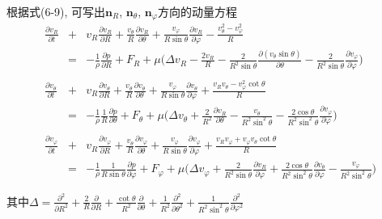 \begin{solution}
\noindent 根据式(6-9), 可写出$\mathbf{n}_R$, $\mathbf{n}_\theta$, $\mathbf{n}_\varphi$方向的动量方程
\begin{eqnarray}
\frac{\partial v_R}{\partial t} &+&
v_R\frac{\partial v_R}{\partial R}+
\frac{v_\theta}{R}\frac{\partial v_R}{\partial\theta}
+\frac{v_\varphi}{R\sin\theta}\frac{\partial v_R}{\partial\varphi}-
\frac{v_\theta^2-v_\varphi^2}{R}\nonumber\\
 & = &  -\frac{1}{\rho}\frac{\partial p}{\partial R} + F_R +
      \mu\Big(
          \Delta v_R -
          \frac{2v_R}{R} -
          \frac{2}{R^2\sin\theta}\frac{\partial(v_\theta\sin\theta)}{\partial\theta} - \frac{2}{R^2\sin\theta}\frac{\partial v_\varphi}{\partial\varphi}
      \Big)
\nonumber\\
\nonumber\\
\frac{\partial v_\theta}{\partial t} &+&
v_R\frac{\partial v_\theta}{\partial R}+
\frac{v_\theta}{R}\frac{\partial v_\theta}{\partial\theta}
+\frac{v_\varphi}{R\sin\theta}\frac{\partial v_\theta}{\partial\varphi}+
\frac{v_Rv_\theta-v_\varphi^2\cot\theta}{R}\nonumber\\
 & = & -\frac{1}{\rho}\frac{1}{R}\frac{\partial p}{\partial\theta} + F_\theta+\mu\Big(
          \Delta v_\theta +
          \frac{2}{R^2}\frac{\partial v_R}{\partial\theta} -
          \frac{v_\theta}{R^2\sin^2\theta} -
          \frac{2\cos\theta}{R^2\sin^2\theta}\frac{\partial v_\varphi}{\partial\varphi}
      \Big)
\nonumber\\
\nonumber\\
\frac{\partial v_\varphi}{\partial t} &+&
v_R\frac{\partial v_\varphi}{\partial R}+
\frac{v_\theta}{R}\frac{\partial v_\varphi}{\partial\theta}
+\frac{v_\varphi}{R\sin\theta}\frac{\partial v_\varphi}{\partial\varphi}
+\frac{v_Rv_\varphi+v_\varphi v_\theta \cot\theta}{R}\nonumber\\
& = & -\frac{1}{\rho}\frac{1}{R\sin\theta}\frac{\partial p}{\partial \varphi} + F_\varphi+\mu\Big(
          \Delta v_\varphi +
          \frac{2}{R^2\sin\theta}\frac{\partial v_R}{\partial\varphi} +
          \frac{2\cos\theta}{R^2\sin^2\theta}\frac{\partial v_\theta}{\partial\varphi}-
          \frac{v_\varphi}{R^2\sin^2\theta}
      \Big)
 \nonumber
\end{eqnarray}

\noindent 其中$\Delta = \frac{\partial^2}{\partial R^2} +
\frac{2}{R}\frac{\partial}{\partial R}+
\frac{\cot\theta}{R^2}\frac{\partial}{\partial\theta}+
\frac{1}{R^2}\frac{\partial^2}{\partial\theta^2}+
\frac{1}{R^2\sin^2\theta}\frac{\partial^2}{\partial\varphi^2}$


\end{solution}
